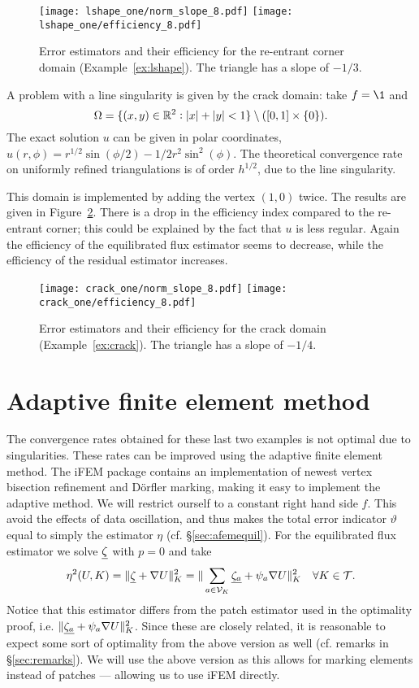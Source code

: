 \documentclass[thesis.tex]{subfiles}
\begin{document}
\begin{figure}
  \centering
  \texttt{[image: lshape\_one/norm\_slope\_8.pdf]}
  \texttt{[image: lshape\_one/efficiency\_8.pdf]}
  \caption{Error estimators and their efficiency for the re-entrant corner domain (Example~\ref{ex:lshape}). The triangle has a slope of $-1/3$.}
  \label{fig:lshapeone}
\end{figure}

\begin{exmp}
  \label{ex:crack}
A problem with a line singularity is given by the crack domain: take $f = \1$ and
\[
  \Omega=\{(x,y) \in \mathbb{R}^2 : |x|+|y|<1\}\setminus ([0,1] \times \set{0}).
\]
The exact solution $u$ can be given in polar coordinates, $u(r, \phi) = r^{1/2}\sin(\phi/2) - 1/2 r^2 \sin^2 (\phi)$.
The theoretical convergence rate on uniformly refined triangulations is of order $h^{1/2}$, due to the line singularity. 
\end{exmp}

This domain is implemented by adding the vertex $(1,0)$ twice.  
The results are given in Figure~\ref{fig:crackone}.
There is a drop in the efficiency index compared to the re-entrant corner; this could
be explained by the fact that $u$ is less regular. Again the efficiency of the equilibrated flux estimator seems to decrease, while the efficiency of the residual estimator increases.
\begin{figure}
  \centering
  \texttt{[image: crack\_one/norm\_slope\_8.pdf]}
  \texttt{[image: crack\_one/efficiency\_8.pdf]}
  \caption{Error estimators and their efficiency for the crack domain (Example~\ref{ex:crack}). The triangle has a slope of $-1/4$.}
  \label{fig:crackone}
\end{figure}

\section{Adaptive finite element method}
The convergence rates obtained for these last two examples is not optimal due to singularities.
These rates can be improved using the adaptive finite element method. The iFEM package contains
an implementation of newest vertex bisection refinement and D\"orfler marking, making it easy
to implement the adaptive method. We will restrict ourself to a constant right hand side $f$. This
avoid the effects of data oscillation, and thus makes the total error indicator $\vartheta$ equal to 
simply the estimator $\eta$ (cf. \S\ref{sec:afemequil}). For the equilibrated flux estimator we 
solve $\underline{\zeta}$ with $p=0$ and take
\[
  \eta^2(U, K) = \|  \underline{\zeta} + \nabla U \|^2_{K} = \| \sum_{a \in \mathcal{V}_K} \underline{\zeta_a} + \psi_a \nabla U \|^2_{K} \quad \forall K \in \mathcal{T}.
\]
Notice that this estimator differs from the patch estimator used in the optimality proof, i.e. $\| \underline{\zeta_a} + \psi_a \nabla U \|^2_K$.
Since these are closely related, it is reasonable to expect some sort of optimality from the above version as well (cf. remarks in \S\ref{sec:remarks}). We will use
the above version as this allows for marking elements instead of patches --- allowing us to use iFEM directly. 
\end{document}
